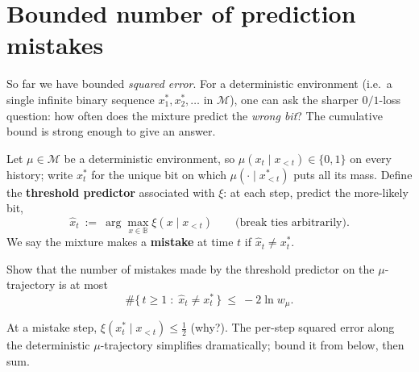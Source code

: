\documentclass[fontsize=11pt, parskip=half]{scrartcl}
\newcommand{\Mc}{\mathcal{M}}
\begin{document}

%


\section{Bounded number of prediction mistakes}\label{prob:mistakes}

So far we have bounded \emph{squared error}. For a deterministic environment
(i.e.\ a single infinite binary sequence $x_1^*, x_2^*, \dots$ in $\Mc$),
one can ask the sharper $0/1$-loss question: how often does the mixture predict
the \emph{wrong bit}? The cumulative bound is strong enough to give an answer.


Let $\mu \in \Mc$ be a deterministic environment, so $\mu(x_t \mid x_{<t}) \in
\{0,1\}$ on every history; write $x_t^*$ for the unique bit on which
$\mu(\cdot \mid x^*_{<t})$ puts all its mass. Define the \textbf{threshold
predictor} associated with $\xi$: at each step, predict the more-likely bit,
\[
  \hat{x}_t ~:=~ \arg\max_{x \in \mathbb{B}} \xi(x \mid x_{<t})
  \qquad \text{(break ties arbitrarily).}
\]
We say the mixture makes a \textbf{mistake} at time $t$ if $\hat{x}_t \neq x_t^*$.

\begin{exercise}
\label{prob:mistakes_ex}



Show that the number of mistakes made by the threshold predictor on the
$\mu$-trajectory is at most
\[
  \#\{\, t \geq 1 \;:\; \hat{x}_t \neq x_t^* \,\}
  ~\leq~ -2 \ln w_\mu.
\]

\begin{hint}
At a mistake step, $\xi(x_t^* \mid x_{<t}) \leq \tfrac12$ (why?).
The per-step squared error along the deterministic $\mu$-trajectory
simplifies dramatically; bound it from below, then sum.
\end{hint}
\end{exercise}
\end{document}
